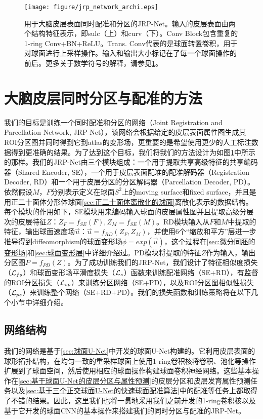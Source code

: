 \begin{figure}[t]
	\centering
	\texttt{[image: figure/jrp\_network\_archi.eps]}
	\caption{用于大脑皮层表面同时配准和分区的JRP-Net。输入的皮层表面由两个结构特征表示，即sulc（上）和curv（下）。Conv Block包含重复的1-ring Conv+BN+ReLU。Trans. Conv代表的是球面转置卷积，用于对球面进行上采样操作。输入和输出大小标记在了每一个球面操作的前后。更多关于数学符号的解释，请参见\ref{sec:大脑皮层同时分区与配准的网络结构}。}\label{fig:jrp_network_archi}
\end{figure}

\section{大脑皮层同时分区与配准的方法}\label{sec:大脑皮层同时分区与配准的网络结构}
我们的目标是训练一个同时配准和分区的网络（Joint Registration and Parcellation Network, JRP-Net），该网络会根据给定的皮层表面属性图生成其ROI分区图并同时得到它到atlas的变形场，更重要的是希望使用更少的人工标注数据得到更准确的结果。为了达到这个目标，我们将我们的方法设计为如图\ref{fig:jrp_network_archi}中所示的那样。我们的JRP-Net由三个模块组成：一个用于提取共享高级特征的共享编码器（Shared Encoder, SE），一个用于皮层表面配准的配准解码器（Registration Decoder, RD）和一个用于皮层分区的分区解码器（Parcellation Decoder, PD）。依然假设$M$，$F$分别表示定义在球面$S^2$上的moving surface和fixed surface，并且是用正二十面体分形体球面\ref{sec:正二十面体离散化的球面}离散化表示的数据结构\cite{fischl2012freesurfer}。每个模块的作用如下，SE模块用来编码输入球面的皮层属性图并且提取高级分层次的皮层特征$Z$：$Z_F=f_{SE}(F), Z_M=f_{SE}(M)$。RD模块输入从$F$和$M$中提取的特征，输出球面速度场$\overrightarrow{u}$：$\overrightarrow{u}=f_{RD}(Z_F,Z_M)$，并使用6个“缩放和平方”层进一步推导得到diffeomorphism的球面变形场$\phi=exp(\overrightarrow{u})$，这个过程在\ref{sec:微分同胚的变形场}和\ref{sec:球面变形层}中详细介绍过。PD模块将提取的特征$Z$作为输入，输出分区图$P=f_{PD}(Z)$。为了成功训练我们的JRP-Net，我们设计了特征相似度损失（${\cal L}_{fs}$）和球面变形场平滑度损失（${\cal L}_s$）函数来训练配准网络（SE+RD），有监督的ROI分区损失（${\cal L}_{sp}$）来训练分区网络（SE+PD），以及ROI分区图相似性损失（${\cal L}_{ps}$）来训练整个网络（SE+RD+PD）。我们的损失函数和训练策略将在以下几个小节中详细介绍。

\subsection{网络结构}\label{sec:大脑皮层同时分区与配准的网络结构2.1}
我们的网络是基于\ref{sec:球面U-Net}中开发的球面U-Net构建的。它利用皮层表面的球形拓扑结构，在均匀一致的重采样球面上使用1-ring卷积核将卷积、池化等操作扩展到了球面空间，然后使用相应的球面操作构建球面卷积神经网络。这些基本操作在\ref{sec:基于球面U-Net的皮层分区与属性预测}的皮层分区和皮层发育属性预测任务以及\ref{sec:基于三个正交球面U-Net的快速球面配准算法}中的配准等任务上都取得了不错的结果。因此，这里我们也将一贯地采用我们之前开发的1-ring卷积核以及基于它开发的球面CNN的基本操作来搭建我们的同时分区与配准的JRP-Net。

